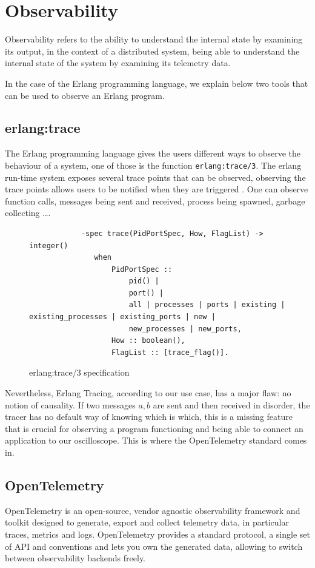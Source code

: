 \section{Observability}
        Observability refers to the ability to understand the internal state by examining its output, in the context of a distributed system, being able to understand the internal state of the system by examining its telemetry data. \cite{otel-o}

    In the case of the Erlang programming language, we explain below two tools that can be used to observe an Erlang program.
    
    \subsection{erlang:trace}
        The Erlang programming language gives the users different ways to observe the behaviour of a system, one of those is the function \texttt{erlang:trace/3}. The erlang run-time system exposes several trace points that can be observed, observing the trace points allows users to be notified when they are triggered \cite{erl-t}. One can observe function calls, messages being sent and received, process being spawned, garbage collecting \dots. 
        \begin{figure}[!ht]
        \centering
        \begin{verbatim}
            -spec trace(PidPortSpec, How, FlagList) -> integer()
               when
                   PidPortSpec ::
                       pid() |
                       port() |
                       all | processes | ports | existing | existing_processes | existing_ports | new |
                       new_processes | new_ports,
                   How :: boolean(),
                   FlagList :: [trace_flag()].
        \end{verbatim}
        \caption{erlang:trace/3 specification}
\end{figure}

    Nevertheless, Erlang Tracing, according to our use case, has a major flaw: no notion of causality. If two messages $a, b$ are sent and then received in disorder, the tracer has no default way of knowing which is which, this is a missing feature that is crucial for observing a program functioning and being able to connect an application to our oscilloscope.  This is where the OpenTelemetry standard comes in.

\subsection{OpenTelemetry}
    OpenTelemetry is an open-source, vendor agnostic observability framework and toolkit designed to generate, export and collect telemetry data, in particular traces, metrics and logs. \cite{otel-o}  OpenTelemetry provides a standard protocol, a single set of API and conventions and lets you own the generated data, allowing to switch between observability backends freely.
   
